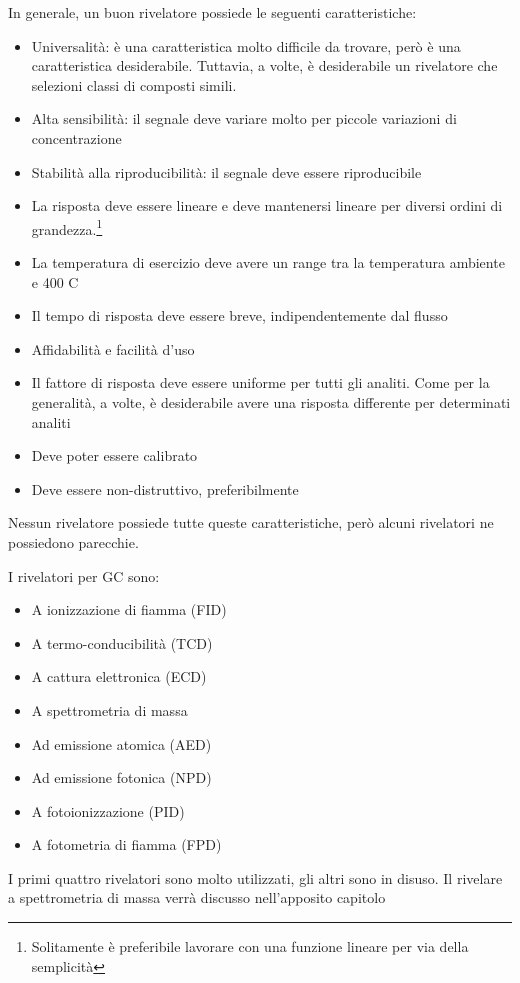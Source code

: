 In generale, un buon rivelatore possiede le seguenti caratteristiche:
\begin{itemize}
\item Universalità: è una caratteristica molto difficile da trovare, però è una caratteristica desiderabile. Tuttavia, a volte, è desiderabile un rivelatore che selezioni classi di composti simili.
\item Alta sensibilità: il segnale deve variare molto per piccole variazioni di concentrazione
\item Stabilità alla riproducibilità: il segnale deve essere riproducibile
\item La risposta deve essere lineare e deve mantenersi lineare per diversi ordini di grandezza.\footnote{Solitamente è preferibile lavorare con una funzione lineare per via della semplicità}
\item La temperatura di esercizio deve avere un range tra la temperatura ambiente e 400 C \degree
\item Il tempo di risposta deve essere breve, indipendentemente dal flusso
\item Affidabilità e facilità d'uso
\item Il fattore di risposta deve essere uniforme per tutti gli analiti. Come per la generalità, a volte, è desiderabile avere una risposta differente per determinati analiti
\item Deve poter essere calibrato
\item Deve essere non-distruttivo, preferibilmente
\end{itemize}
Nessun rivelatore possiede tutte queste caratteristiche, però alcuni rivelatori ne possiedono parecchie.

I rivelatori per GC sono:
\begin{itemize}
\item A ionizzazione di fiamma (FID)
\item A termo-conducibilità (TCD)
\item A cattura elettronica (ECD)
\item A spettrometria di massa
\item Ad emissione atomica (AED)
\item Ad emissione fotonica (NPD)
\item A fotoionizzazione (PID)
\item A fotometria di fiamma (FPD)
\end{itemize}
I primi quattro rivelatori sono molto utilizzati, gli altri sono in disuso. Il rivelare a spettrometria di massa verrà discusso nell'apposito capitolo

